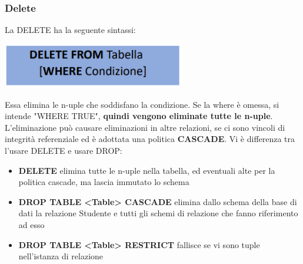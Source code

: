 \documentclass[12pt]{article}
\begin{document}
\subsubsection{Delete}
La DELETE ha la seguente sintassi:
\begin{center}
    \includegraphics[width = 0.60\textwidth]{Images/205.PNG}
\end{center}
Essa elimina le n-uple che soddisfano la condizione. Se la where è omessa, si intende "WHERE TRUE", \textbf{quindi vengono eliminate tutte le n-uple}.
L'eliminazione può causare eliminazioni in altre relazioni, se ci sono vincoli di integrità referenziale ed è adottata una politica \textbf{CASCADE}.
Vi è differenza tra l'usare DELETE e usare DROP:
\begin{itemize}
    \item \textbf{DELETE} elimina tutte le n-uple nella tabella, ed eventuali alte per la politica cascade, ma lascia immutato lo schema
    \item \textbf{DROP TABLE <Table> CASCADE} elimina dallo schema della base di dati la relazione Studente e tutti gli schemi di relazione che fanno riferimento ad esso
    \item \textbf{DROP TABLE <Table> RESTRICT} fallisce se vi sono tuple nell'istanza di relazione
\end{itemize}
\end{document}
